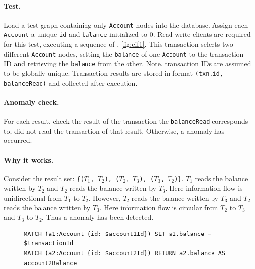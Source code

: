 \paragraph{Test.}
Load a test graph containing only \texttt{Account} nodes into the database.
Assign each \texttt{Account} a unique \texttt{id} and \texttt{balance}
initialized to 0. Read-write clients are required for this test, executing a
sequence of , \autoref{fig:cif1}. This transaction
selects two different \texttt{Account} nodes, setting the \texttt{balance} of
one \texttt{Account} to the transaction ID and retrieving the \texttt{balance}
from the other. Note, transaction IDs are assumed to be globally unique.
Transaction results are stored in format \texttt{(txn.id, balanceRead)} and
collected after execution.

\paragraph{Anomaly check.}
For each result, check the result of the transaction the \texttt{balanceRead}
corresponds to, did not read the transaction of that result. Otherwise, a
 anomaly has occurred.

\paragraph{Why it works.}
Consider the result set:
\texttt{\{($T_\mathrm{1}$, $T_\mathrm{2}$), ($T_\mathrm{2}$, $T_\mathrm{3}$),
  ($T_\mathrm{3}$, $T_\mathrm{2}$)\}}. $T_\mathrm{1}$ reads the balance written by
$T_\mathrm{2}$ and $T_\mathrm{2}$ reads the balance written by $T_\mathrm{3}$.
Here information flow is unidirectional from $T_\mathrm{1}$ to $T_\mathrm{2}$.
However, $T_\mathrm{2}$ reads the balance written by $T_\mathrm{3}$ and
$T_\mathrm{2}$ reads the balance written by $T_\mathrm{3}$. Here information flow
is circular from $T_\mathrm{2}$ to $T_\mathrm{3}$ and $T_\mathrm{3}$ to $T_\mathrm{2}$.
Thus a  anomaly has been detected.

\begin{figure}[htb]
  \begin{lstlisting}[language=cypher,label=fig:cif1,caption=\tx{G1c $T_\mathrm{RW}$}.]
MATCH (a1:Account {id: $account1Id}) SET a1.balance = $transactionId
MATCH (a2:Account {id: $account2Id}) RETURN a2.balance AS account2Balance
\end{lstlisting}
\end{figure}

